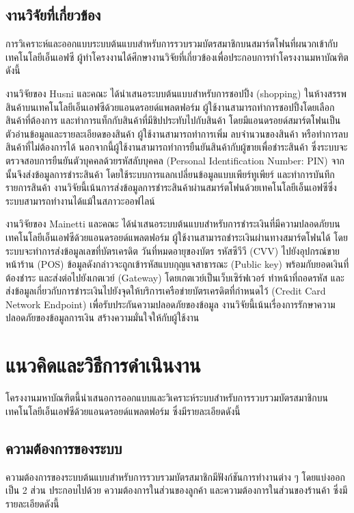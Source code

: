 \documentclass[a4paper]{article}
\begin{document}
\subsection{งานวิจัยที่เกี่ยวข้อง}
การวิเคราะห์และออกแบบระบบต้นแบบสำหรับการรวบรวมบัตรสมาชิกบนสมาร์ตโฟนที่ผนวกเข้ากับเทคโนโลยีเอ็นเอฟซี ผู้ทำโครงงานได้ศึกษางานวิจัยที่เกี่ยวข้องเพื่อประกอบการทําโครงงานมหาบัณฑิต ดังนี้

งานวิจัยของ Husni และคณะ \cite{itm:shopping} ได้นำเสนอระบบต้นแบบสำหรับการชอปปิ้ง (shopping) ในห้างสรรพสินค้าบนเทคโนโลยีเอ็นเอฟซีด้วยแอนดรอยด์แพลตฟอร์ม ผู้ใช้งานสามารถทำการชอปปิ้งโดยเลือกสินค้าที่ต้องการ และทำการแท็กกับสินค้าที่มีชิปประทับไปกับสินค้า โดยมีแอนดรอยด์สมาร์ตโฟนเป็นตัวอ่านข้อมูลและรายละเอียดของสินค้า ผู้ใช้งานสามารถทำการเพิ่ม ลบจำนวนของสินค้า หรือทำการลบสินค้าที่ไม่ต้องการได้ นอกจากนี้ผู้ใช้งานสามารถทำการยืนยันสินค้ากับผู้ขายเพื่อชำระสินค้า ซึ่งระบบจะตรวจสอบการยืนยันตัวบุคคลด้วยรหัสลับบุคคล (Personal Identification Number: PIN) จากนั้นจึงส่งข้อมูลการชำระสินค้า โดยใช้ระบบการแลกเปลี่ยนข้อมูลแบบเพียร์ทูเพียร์ และทำการบันทึกรายการสินค้า งานวิจัยนี้เน้นการส่งข้อมูลการชำระสินค้าผ่านสมาร์ตโฟนด้วยเทคโนโลยีเอ็นเอฟซีซึ่งระบบสามารถทำงานได้แม้ในสภาวะออฟไลน์

งานวิจัยของ Mainetti และคณะ \cite{itm:IDA-Pay} ได้นำเสนอระบบต้นแบบสำหรับการชำระเงินที่มีความปลอดภัยบนเทคโนโลยีเอ็นเอฟซีด้วยแอนดรอยด์แพลตฟอร์ม ผู้ใช้งานสามารถชำระเงินผ่านทางสมาร์ตโฟนได้ โดยระบบจะทำการส่งข้อมูลเลขที่บัตรเครดิต วันที่หมดอายุของบัตร รหัสซีวีวี (CVV) ไปยังอุปกรณ์ขายหน้าร้าน (POS) ข้อมูลดังกล่าวจะถูกเข้ารหัสแบบกุญแจสาธารณะ (Public key) พร้อมกับยอดเงินที่ต้องชำระ และส่งต่อไปยังเกตเวย์ (Gateway) โดยเกตเวย์เป็นเว็บเซิร์ฟเวอร์ ทำหน้าที่ถอดรหัส และส่งข้อมูลเกี่ยวกับการชำระเงินไปยังจุดให้บริการเครือข่ายบัตรเครดิตที่กำหนดไว้ (Credit Card Network Endpoint) เพื่อรับประกันความปลอดภัยของข้อมูล งานวิจัยนี้เน้นเรื่องการรักษาความปลอดภัยของข้อมูลการเงิน สร้างความมั่นใจให้กับผู้ใช้งาน

\section{แนวคิดและวิธีการดำเนินงาน}
โครงงานมหาบัณฑิตนี้นําเสนอการออกแบบและวิเคราะห์ระบบสำหรับการรวบรวมบัตรสมาชิกบนเทคโนโลยีเอ็นเอฟซีด้วยแอนดรอยด์แพลตฟอร์ม ซึ่งมีรายละเอียดดังนี้

\subsection{ความต้องการของระบบ}
ความต้องการของระบบต้นแบบสำหรับการรวบรวมบัตรสมาชิกมีฟังก์ชันการทำงานต่าง ๆ โดยแบ่งออกเป็น 2 ส่วน ประกอบไปด้วย ความต้องการในส่วนของลูกค้า และความต้องการในส่วนของร้านค้า ซึ่งมีรายละเอียดดังนี้
\end{document}
